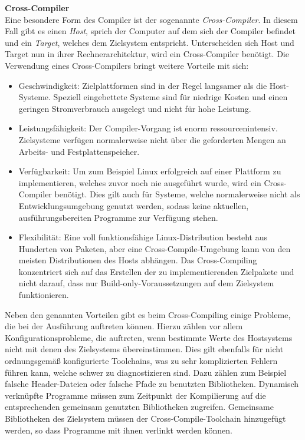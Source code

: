 \textbf{Cross-Compiler}\\
Eine besondere Form des Compiler ist der sogenannte \emph{Cross-Compiler}. In diesem Fall gibt es einen \emph{Host}, sprich der Computer auf dem sich der Compiler befindet und ein
\emph{Target}, welches dem Zielsystem entspricht. Unterscheiden sich Host und Target nun in ihrer Rechnerarchitektur, wird ein Cross-Compiler benötigt.
Die Verwendung eines Cross-Compilers bringt weitere Vorteile mit sich:
\begin{itemize}
  \item Geschwindigkeit: Zielplattformen sind in der Regel langsamer als die Host-Systeme. Speziell eingebettete Systeme sind für niedrige Kosten und einen geringen Stromverbrauch ausgelegt
                          und nicht für hohe Leistung.
  \item Leistungsfähigkeit: Der Compiler-Vorgang ist enorm ressourcenintensiv. Zielsysteme verfügen normalerweise nicht über die geforderten Mengen an Arbeits- und Festplattenspeicher.
  \item Verfügbarkeit: Um zum Beispiel Linux erfolgreich auf einer Plattform zu implementieren, welches zuvor noch nie ausgeführt wurde, wird ein Cross-Compiler benötigt. Dies gilt auch für
                      Systeme, welche normalerweise nicht als Entwicklungsumgebung genutzt werden, sodass keine aktuellen, ausführungsbereiten Programme zur Verfügung stehen.
  \item Flexibilität: Eine voll funktionsfähige Linux-Distribution besteht aus Hunderten von Paketen, aber eine Cross-Compile-Umgebung kann von den meisten Distributionen des Hosts abhängen.
                      Das Cross-Compiling konzentriert sich auf das Erstellen der zu implementierenden Zielpakete und nicht darauf, dass nur Build-only-Voraussetzungen auf dem Zielsystem funktionieren.
\end{itemize}


Neben den genannten Vorteilen gibt es beim Cross-Compiling einige Probleme, die bei der Ausführung auftreten können. Hierzu zählen vor allem Konfigurationsprobleme, die auftreten, wenn
bestimmte Werte des Hostsystems nicht mit denen des Zielsystems übereinstimmen. Dies gilt ebenfalls für nicht ordnungsgemäß konfigurierte Toolchains, was zu sehr komplizierten Fehlern führen kann,
welche schwer zu diagnostizieren sind. Dazu zählen zum Beispiel falsche Header-Dateien oder falsche Pfade zu benutzten Bibliotheken. Dynamisch verknüpfte Programme müssen zum Zeitpunkt
der Kompilierung auf die entsprechenden gemeinsam genutzten Bibliotheken zugreifen. Gemeinsame Bibliotheken des Zielsystem müssen der Cross-Compile-Toolchain hinzugefügt werden,
 so dass Programme mit ihnen verlinkt werden können.~\cite{crosscompiler}
